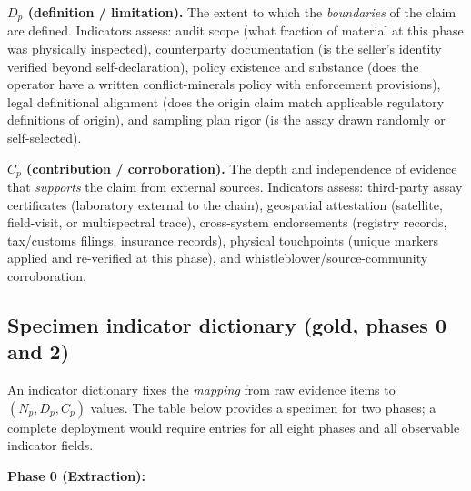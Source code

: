 \documentclass[12pt]{article}
\begin{document}
\textbf{\(D_p\) (definition / limitation).} The extent to which the
\emph{boundaries} of the claim are defined. Indicators assess: audit
scope (what fraction of material at this phase was physically
inspected), counterparty documentation (is the seller's identity
verified beyond self-declaration), policy existence and substance (does
the operator have a written conflict-minerals policy with enforcement
provisions), legal definitional alignment (does the origin claim match
applicable regulatory definitions of origin), and sampling plan rigor
(is the assay drawn randomly or self-selected).

\textbf{\(C_p\) (contribution / corroboration).} The depth and
independence of evidence that \emph{supports} the claim from external
sources. Indicators assess: third-party assay certificates (laboratory
external to the chain), geospatial attestation (satellite, field-visit,
or multispectral trace), cross-system endorsements (registry records,
tax/customs filings, insurance records), physical touchpoints (unique
markers applied and re-verified at this phase), and
whistleblower/source-community corroboration.

\subsection{Specimen indicator dictionary (gold, phases 0 and 2)}\label{specimen-indicator-dictionary-gold-phases-0-and-2}

An indicator dictionary fixes the \emph{mapping} from raw evidence items
to \((N_p, D_p, C_p)\) values. The table below provides a specimen for
two phases; a complete deployment would require entries for all eight
phases and all observable indicator fields.

\textbf{Phase 0 (Extraction):}
\end{document}
